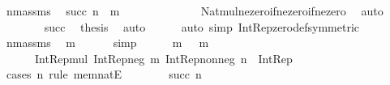 \begin{isabellebody}
\ n{\isacharunderscore}{\kern0pt}m{\isacharunderscore}{\kern0pt}assms\ \isamarkupfalse%
\ {\isachardoublequoteopen}succ\ n\ {\isacharasterisk}{\kern0pt}\ m\ {\isasymin}\ {\isasymnat}\ {\isasymsetminus}\ {\isacharbraceleft}{\kern0pt}{}{\isacharbraceright}{\kern0pt}{\isachardoublequoteclose}\isanewline
\ \ \ \ \ \ \ \ \isamarkupfalse%
\ Nat{\isacharunderscore}{\kern0pt}mul{\isacharunderscore}{\kern0pt}ne{\isacharunderscore}{\kern0pt}zero{\isacharunderscore}{\kern0pt}if{\isacharunderscore}{\kern0pt}ne{\isacharunderscore}{\kern0pt}zero{\isacharunderscore}{\kern0pt}if{\isacharunderscore}{\kern0pt}ne{\isacharunderscore}{\kern0pt}zero\ \isamarkupfalse%
\ auto\isanewline
\ \ \ \ \ \ \isamarkupfalse%
\ succ\ \isamarkupfalse%
\ {\isacharquery}{\kern0pt}thesis\ \isamarkupfalse%
\ auto\isanewline
\ \ \ \ \isamarkupfalse%
\ {\isacharparenleft}{\kern0pt}auto\ simp{\isacharcolon}{\kern0pt}\ Int{\isacharunderscore}{\kern0pt}Rep{\isacharunderscore}{\kern0pt}zero{\isacharunderscore}{\kern0pt}def{\isacharbrackleft}{\kern0pt}symmetric{\isacharbrackright}{\kern0pt}{\isacharparenright}{\kern0pt}\isanewline
\isanewline
\ \ \ \ \isamarkupfalse%
\ n{\isacharunderscore}{\kern0pt}m{\isacharunderscore}{\kern0pt}assms\ \isamarkupfalse%
\ {\isachardoublequoteopen}m\ {\isasymin}\ {\isasymnat}\ {\isasymsetminus}\ {\isacharbraceleft}{\kern0pt}{}{\isacharbraceright}{\kern0pt}{\isachardoublequoteclose}\ \isamarkupfalse%
\ simp\isanewline
\ \ \ \ \isamarkupfalse%
\ {\isacartoucheopen}m\ {\isasymin}\ {\isasymnat}{\isacartoucheclose}\ {\isacartoucheopen}m\ {\isasymnoteq}\ {}{\isacartoucheclose}\ \isamarkupfalse%
\isanewline
\ \ \ \ \ \ {\isachardoublequoteopen}Int{\isacharunderscore}{\kern0pt}Rep{\isacharunderscore}{\kern0pt}mul\ {\isacharparenleft}{\kern0pt}Int{\isacharunderscore}{\kern0pt}Rep{\isacharunderscore}{\kern0pt}neg\ m{\isacharparenright}{\kern0pt}\ {\isacharparenleft}{\kern0pt}Int{\isacharunderscore}{\kern0pt}Rep{\isacharunderscore}{\kern0pt}nonneg\ n{\isacharparenright}{\kern0pt}\ {\isacharcolon}{\kern0pt}\ Int{\isacharunderscore}{\kern0pt}Rep{\isachardoublequoteclose}\isanewline
\ \ \ \ \isamarkupfalse%
\ {\isacharparenleft}{\kern0pt}cases\ n\ rule{\isacharcolon}{\kern0pt}\ mem{\isacharunderscore}{\kern0pt}natE{\isacharparenright}{\kern0pt}\isanewline
\ \ \ \ \ \ \isamarkupfalse%
\ {\isacharparenleft}{\kern0pt}succ\ n{\isacharparenright}{\kern0pt}\isanewline

\end{isabellebody}
